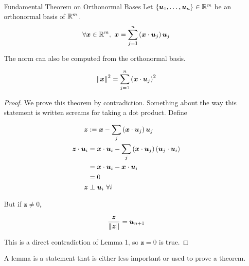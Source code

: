 \documentclass[11pt]{article}
\begin{document}
\begin{theorem}{Fundamental Theorem on Orthonormal Bases}
  Let $\left \{ \bm{u}_1, \dots, \bm{u}_n \right \} \in \mathbb R^m$ be an orthonormal basis of $\mathbb R^m$.
  \begin{align*}
    \forall \bm{x} \in \mathbb R^m,\ \bm{x} &= \sum \limits_{j=1}^{n} \left ( \bm{x} \cdot \bm{u}_j \right) \bm{u}_j \\
  \end{align*}

  The norm can also be computed from the orthonormal basis.
  
  $$
  \left\lVert\bm{x}\right\rVert^2 = \sum \limits_{j=1}^{n} \left ( \bm{x} \cdot \bm{u}_j \right)^2
  $$

  \begin{proof}
    We prove this theorem by contradiction.
    Something about the way this statement is written screams for taking a dot product.
    Define

    \begin{align*}
      \bm{z} & := \bm{x} - \sum_j \left ( \bm{x} \cdot \bm{u}_j \right) \bm{u}_j \\
      \bm{z} \cdot \bm{u}_i &= \bm{x} \cdot \bm{u}_i - \sum_j \left ( \bm{x} \cdot \bm{u}_j \right) \left ( \bm{u}_j \cdot \bm{u}_i \right) \\
             &= \bm{x} \cdot \bm{u}_i - \bm{x} \cdot \bm{u}_i \\
             &= 0 \\
      \bm{z} & \perp \bm{u}_i\ \forall i \\
    \end{align*}

    But if $\bm{z} \neq 0$,
    
    $$
    \frac{\bm{z}}{\left\lVert\bm{z}\right\rVert} = \bm{u}_{n+1}
    $$

    This is a direct contradiction of Lemma 1, so $\bm{z} = 0$ is true.

    
    
  \end{proof}
  
\end{theorem}

\begin{remark}
  
  A lemma is a statement that is either less important or used to prove a theorem.
\end{remark}
\end{document}
